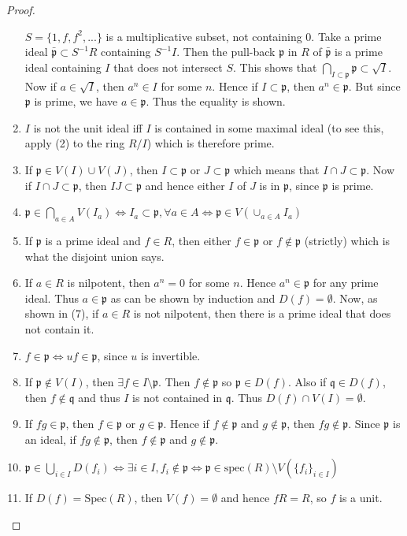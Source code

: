 \begin{proof}
\begin{enumerate}
$S = \{1,f,f^2,...\}$ is a multiplicative subset, not containing $0$. Take a 
prime ideal $\bar{\mathfrak{p}} \subset S^{-1}R$ containing $S^{-1}I$. Then the 
pull-back $\mathfrak{p}$ in $R$ of $\bar{\mathfrak{p}}$ is a prime ideal 
containing $I$ that does not intersect $S$. This shows that $\bigcap_{I \subset 
\mathfrak p} \mathfrak p \subset \sqrt{I}$. Now if $a \in \sqrt{I}$, then $a^n 
\in I$ for some $n$. Hence if $I \subset \mathfrak{p}$, then $a^n \in 
\mathfrak{p}$. But since $\mathfrak{p}$ is prime, we have $a \in \mathfrak{p}$. 
Thus the equality is shown.
\item $I$ is not the unit ideal iff $I$ is contained in some maximal ideal (to 
see this, apply (2) to the ring $R/I$) which is therefore prime.
\item If $\mathfrak{p} \in V(I) \cup V(J)$, then $I \subset \mathfrak{p}$ or $J 
\subset \mathfrak{p}$ which means that $I \cap J \subset \mathfrak{p}$. Now if 
$I \cap J \subset \mathfrak{p}$, then $IJ \subset \mathfrak{p}$ and hence 
either $I$ of $J$ is in $\mathfrak{p}$, since $\mathfrak{p}$ is prime.
\item $\mathfrak{p} \in \bigcap_{a \in A} V(I_a) \Leftrightarrow I_a \subset 
\mathfrak{p}, \forall a \in A \Leftrightarrow \mathfrak{p} \in V(\cup_{a\in A} 
I_a)$
\item If $\mathfrak{p}$ is a prime ideal and $f \in R$, then either $f \in 
\mathfrak{p}$ or $f \notin \mathfrak{p}$ (strictly) which is what the disjoint 
union says.
\item If $a \in R$ is nilpotent, then $a^n = 0$ for some $n$. Hence $a^n \in 
\mathfrak{p}$ for any prime ideal. Thus $a \in \mathfrak{p}$ as can be shown by 
induction and $D(f)=\emptyset$. Now, as shown in (7), if $a \in R$ is not 
nilpotent, then there is a prime ideal that does not contain it.
\item $f \in \mathfrak{p} \Leftrightarrow uf \in \mathfrak{p}$, since $u$ is 
invertible.
\item If $\mathfrak{p} \notin V(I)$, then $\exists f \in I \setminus 
\mathfrak{p}$. Then $f \notin \mathfrak{p}$ so $\mathfrak{p} \in D(f)$. Also if 
$\mathfrak{q} \in D(f)$, then $f \notin \mathfrak{q}$ and thus $I$ is not 
contained in $\mathfrak{q}$. Thus $D(f) \cap V(I) = \emptyset$.
\item If $fg \in \mathfrak{p}$, then $f \in \mathfrak{p}$ or $g \in 
\mathfrak{p}$. Hence if $f \notin \mathfrak{p}$ and $g \notin \mathfrak{p}$, 
then $fg \notin \mathfrak{p}$. Since $\mathfrak{p}$ is an ideal, if $fg \notin 
\mathfrak{p}$, then $f \notin \mathfrak{p}$ and $g \notin \mathfrak{p}$.
\item $\mathfrak{p} \in \bigcup_{i \in I} D(f_i) \Leftrightarrow \exists i \in 
I, f_i \notin \mathfrak{p} \Leftrightarrow \mathfrak{p} \in \mathrm{spec}(R) 
\setminus V(\{f_i\}_{i \in I})$
\item If $D(f) = \text{Spec}(R)$, then $V(f) = \emptyset$ and
hence $fR = R$, so $f$ is a unit.
\end{enumerate}
\end{proof}

